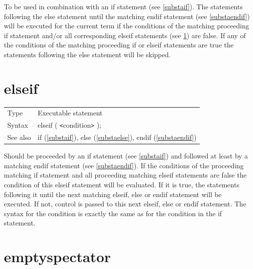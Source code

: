 \noindent To be used in combination with an if statement (see 
\ref{substaif}). The statements following the
else statement until the matching 
endif 
statement (see \ref{substaendif}) will be executed for the current term if 
the conditions of the matching proceeding if 
statement and/or all corresponding elseif statements (see 
\ref{substaelseif}) are false. If any of the conditions of the matching 
proceeding if or elseif statements are true the statements following the 
else statement will be skipped. \vspace{10mm}

 
\section{elseif}
\label{substaelseif}

\noindent \begin{tabular}{ll}
Type & Executable statement\\
Syntax & elseif ( {\tt<}condition{\tt>} );
\\ See also & if (\ref{substaif}),
              else (\ref{substaelse}),
              endif (\ref{substaendif})
\end{tabular} \vspace{4mm}

\noindent Should be proceeded by an if 
statement (see \ref{substaif}) and followed at least by a matching 
endif 
statement (see \ref{substaendif}). If the conditions of the proceeding 
matching if statement and all proceeding matching
elseif statements are false the 
condition of this elseif statement will be evaluated. If it is true, the 
statements following it until the next matching elseif,
else or endif statement will be executed. 
If not, control is passed to this next elseif, else or endif statement. The 
syntax for the condition is exactly the same as for the condition in the if 
statement. \vspace{10mm}
 

\section{emptyspectator}
\label{substaemptyspectator}

